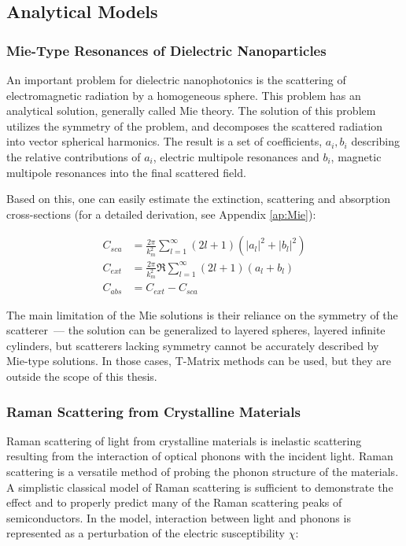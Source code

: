     \subsection{Analytical Models}
        \subsubsection{Mie-Type Resonances of Dielectric Nanoparticles}
                An important problem for dielectric nanophotonics is the scattering of electromagnetic radiation by
            a homogeneous sphere. This problem has an analytical solution, generally called Mie theory\cite{mie1908beitrage}.
            The solution of this problem utilizes the symmetry of the problem, and decomposes the scattered radiation into
            vector spherical harmonics. The result is a set of coefficients, $a_i, b_i$ describing the relative contributions
            of $a_i$, electric multipole resonances and $b_i$, magnetic multipole resonances into the final scattered field.

                Based on this, one can easily estimate the extinction, scattering and absorption cross-sections (for a detailed
                derivation, see Appendix \ref{ap:Mie}):

            \begin{align}
                C_{sca} &= \frac{2\pi}{k^2_m}\sum_{l=1}^\infty (2l +1)(|a_l|^2 + |b_l|^2)\\
                C_{ext} &= \frac{2\pi}{k^2_m}\Re\sum_{l=1}^\infty (2l +1)(a_l + b_l)\\
                C_{abs} &= C_{ext} - C_{sca}
            \end{align}

                The main limitation of the Mie solutions is their reliance on the symmetry of the scatterer~--- the solution can
            be generalized to layered spheres, layered  infinite cylinders, but scatterers lacking symmetry cannot be accurately described
            by Mie-type solutions. In those cases, T-Matrix methods can be used, but they are outside the scope of this thesis.

        \subsubsection{Raman Scattering from Crystalline Materials}
                Raman scattering of light from crystalline materials is inelastic scattering resulting from the interaction of optical phonons with
            the incident light. Raman scattering is a versatile method of probing the phonon structure of the materials.
            A simplistic classical model of Raman scattering is sufficient to demonstrate the effect and to properly predict many of the
            Raman scattering peaks of semiconductors\cite{peter2010fundamentals}. In the model, interaction between light and phonons
            is represented as a perturbation of the electric susceptibility $\chi$:

